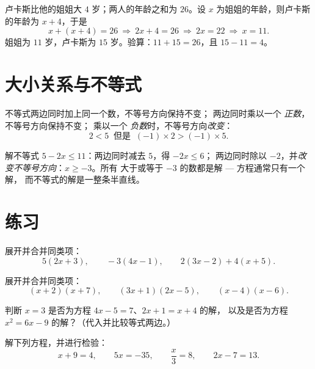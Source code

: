\begin{example}\label{ex:g8:equations:problem}
卢卡斯比他的姐姐大 $4$ 岁；两人的年龄之和为
$26$。设 $x$ 为姐姐的年龄，则卢卡斯的年龄为 $x + 4$，于是
\[
x + (x + 4) = 26
\ \Longrightarrow\
2x + 4 = 26
\ \Longrightarrow\
2x = 22
\ \Longrightarrow\
x = 11 .
\]
姐姐为 $11$ 岁，卢卡斯为 $15$ 岁。验算：$11 + 15 = 26$，且
$15 - 11 = 4$。
\end{example}

\section{大小关系与不等式}

\begin{proposition}[运算与大小关系]\label{prop:g8:equations:order}
不等式两边同时加上同一个数，不等号方向保持不变；
两边同时乘以一个 \emph{正数}，不等号方向保持不变；
乘以一个 \emph{负数}时，不等号方向\emph{改变}：
\[
2 < 5 \ \text{ 但是 }\ (-1) \times 2 > (-1) \times 5 .
\]
\end{proposition}
\admitted

\begin{example}\label{ex:g8:equations:inequality}
解不等式 $5 - 2x \leq 11$：两边同时减去 $5$，得 $-2x \leq 6$；
两边同时除以 $-2$，并\emph{改变不等号方向}：$x \geq -3$。所有
大于或等于 $-3$ 的数都是解 --- 方程通常只有一个解，
而不等式的解是一整条半直线。
\end{example}

\section{练习}

\begin{exercise}[$\star$]\label{exo:g8:equations:1}
展开并合并同类项：
\[
5(2x + 3), \qquad
-3(4x - 1), \qquad
2(3x - 2) + 4(x + 5).
\]
\end{exercise}

\begin{exercise}[$\star$]\label{exo:g8:equations:2}
展开并合并同类项：
\[
(x + 2)(x + 7), \qquad
(3x + 1)(2x - 5), \qquad
(x - 4)(x - 6).
\]
\end{exercise}

\begin{exercise}[$\star$]\label{exo:g8:equations:3}
判断 $x = 3$ 是否为方程 $4x - 5 = 7$、$2x + 1 = x + 4$ 的解，
以及是否为方程 $x^2 = 6x - 9$ 的解？（代入并比较等式两边。）
\end{exercise}

\begin{exercise}[$\star$]\label{exo:g8:equations:4}
解下列方程，并进行检验：
\[
x + 9 = 4, \qquad
5x = -35, \qquad
\frac{x}{3} = 8, \qquad
2x - 7 = 13 .
\]
\end{exercise}

